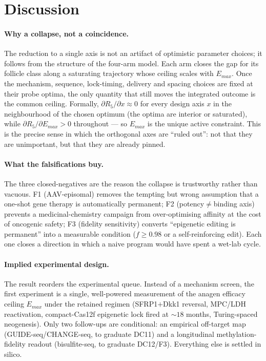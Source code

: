 \documentclass[11pt,a4paper]{article}
\begin{document}
\section{Discussion}
\label{sec:discussion}

\paragraph{Why a collapse, not a coincidence.} The reduction to a single axis is
not an artifact of optimistic parameter choices; it follows from the structure of
the four-arm model. Each arm closes the gap for its follicle class along a
saturating trajectory whose ceiling scales with $E_{max}$. Once the mechanism,
sequence, lock-timing, delivery and spacing choices are fixed at their probe
optima, the only quantity that still moves the integrated outcome is the common
ceiling. Formally, $\partial R_5/\partial x \approx 0$ for every design axis $x$ in
the neighbourhood of the chosen optimum (the optima are interior or saturated),
while $\partial R_5/\partial E_{max}>0$ throughout --- so $E_{max}$ is the unique
active constraint. This is the precise sense in which the orthogonal axes are
``ruled out'': not that they are unimportant, but that they are already pinned.

\paragraph{What the falsifications buy.} The three closed-negatives are the reason
the collapse is trustworthy rather than vacuous. F1 (AAV-episomal) removes the
tempting but wrong assumption that a one-shot gene therapy is automatically
permanent; F2 (potency$\neq$binding axis) prevents a medicinal-chemistry campaign
from over-optimising affinity at the cost of oncogenic safety; F3 (fidelity
sensitivity) converts ``epigenetic editing is permanent'' into a measurable
condition ($f\geq 0.98$ or a self-reinforcing edit). Each one closes a direction in
which a naive program would have spent a wet-lab cycle.

\paragraph{Implied experimental design.} The result reorders the experimental
queue. Instead of a mechanism screen, the first experiment is a single,
well-powered measurement of the anagen efficacy ceiling $E_{max}$ under the
retained regimen (SFRP1$+$Dkk1 reversal, MPC/LDH reactivation, compact-Cas12f
epigenetic lock fired at ${\sim}18$ months, Turing-spaced neogenesis). Only two
follow-ups are conditional: an empirical off-target map (GUIDE-seq/CHANGE-seq, to
graduate DC11) and a longitudinal methylation-fidelity readout (bisulfite-seq, to
graduate DC12/F3). Everything else is settled in silico.
\end{document}
